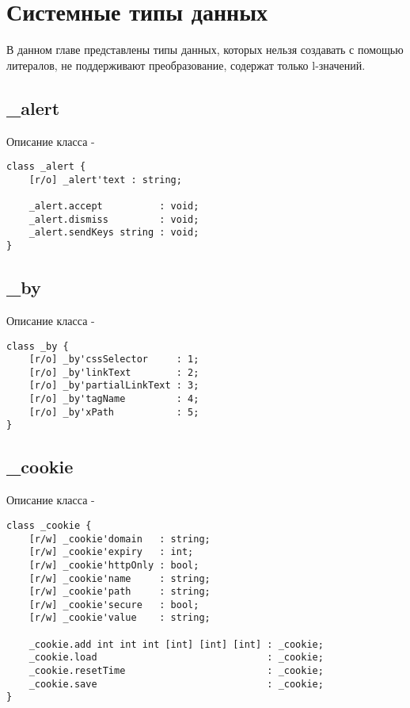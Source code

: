 \section{Системные типы данных}

В данном главе представлены типы данных, которых нельзя создавать с помощью литералов, не поддерживают преобразование, содержат только l-значений.

\subsection{{\color{orange} \_alert}}

\noindent Описание класса  -
\begin{lstlisting}[numbers=none]
class _alert {
	[r/o] _alert'text : string;
	
	_alert.accept          : void;
	_alert.dismiss         : void;
	_alert.sendKeys string : void;
}
\end{lstlisting}

\subsection{{\color{orange} \_by}}

\noindent Описание класса  -
\begin{lstlisting}[numbers=none]
class _by {
	[r/o] _by'cssSelector     : 1;
	[r/o] _by'linkText        : 2;
	[r/o] _by'partialLinkText : 3;
	[r/o] _by'tagName         : 4;
	[r/o] _by'xPath           : 5;
}
\end{lstlisting}

\subsection{{\color{orange} \_cookie}}

\noindent Описание класса  -
\begin{lstlisting}[numbers=none]
class _cookie {
	[r/w] _cookie'domain   : string;
	[r/w] _cookie'expiry   : int;
	[r/w] _cookie'httpOnly : bool;
	[r/w] _cookie'name     : string;
	[r/w] _cookie'path     : string;
	[r/w] _cookie'secure   : bool;
	[r/w] _cookie'value    : string;
	
	_cookie.add int int int [int] [int] [int] : _cookie;
	_cookie.load                              : _cookie;
	_cookie.resetTime                         : _cookie;
	_cookie.save                              : _cookie;
}
\end{lstlisting}

